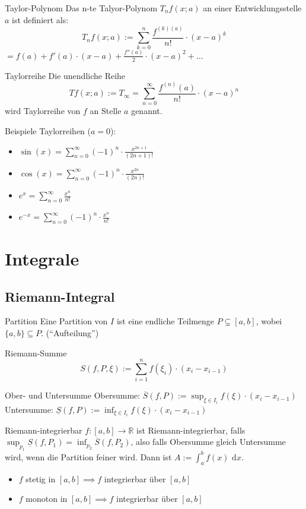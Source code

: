 \documentclass[a4paper,10pt]{article}
\def\sumn{\sum\limits_{n=0}^{\infty}}
\def\R{\mathbb{R}}
\def\dx{\text{ d}x}
\begin{document}
\begin{subbox}{Taylor-Polynom}
 Das n-te Talyor-Polynom $T_n f(x; a)$ an einer Entwicklungsstelle $a$ ist definiert als:
 $$T_n f(x; a) := \sum_{k=0}^{n} \frac{f^{(k) (a)}}{n!} \cdot (x - a)^k$$ 
 $ = f(a) + f'(a) \cdot (x-a) + \frac{f''(a)}{2} \cdot (x - a)^2 + \ldots$
\end{subbox}

\begin{mainbox}{Taylorreihe}
 Die unendliche Reihe
 $$Tf(x;a) := T_\infty = \sumn \frac{f^{(n)}(a)}{n!} \cdot (x-a)^n$$
 wird Taylorreihe von $f$ an Stelle $a$ genannt.
\end{mainbox}
Beispiele Taylorreihen ($a = 0$):
\begin{itemize}
 \item $\sin(x) = \sumn (-1)^n \cdot \frac{x^{2n+1}}{(2n+1)!}$
 \item $\cos(x) = \sumn (-1)^n \cdot \frac{x^{2n}}{(2n)!}$
 \item $e^x = \sumn \frac{x^n}{n!}$
 \item $e^{-x} = \sumn (-1)^n \cdot \frac{x^n}{n!}$
\end{itemize}

\section{Integrale}
\subsection{Riemann-Integral}
\begin{subbox}{Partition}
 Eine Partition von $I$ ist eine endliche Teilmenge $P \subsetneq [a,b]$, wobei $\{a,b\} \subseteq P$. (``Aufteilung'')
\end{subbox}
\begin{mainbox}{Riemann-Summe}
 $$S(f, P, \xi) := \sum_{i=1}^n f(\xi_i) \cdot (x_i - x_{i-1})$$
\end{mainbox}
\begin{subbox}{Ober- und Untersumme}
 Obersumme: $\overline{S}(f,P) := \sup_{\xi \in I_i} f(\xi) \cdot (x_i - x_{i-1})$ \\
 Untersumme: $\underline{S}(f,P) := \inf_{\xi \in I_i} f(\xi) \cdot (x_i - x_{i-1})$
\end{subbox}
\begin{mainbox}{Riemann-integrierbar}
 $f:[a,b] \to \R$ ist Riemann-integrierbar, falls $\sup_{p_1} \underline{S}(f,P_1) = \inf_{p_2}\overline{S}(f, P_2)$, also falls Obersumme gleich Untersumme wird, wenn die Partition feiner wird. Dann ist $A := \int_a^b f(x)\dx$.
\end{mainbox}
\begin{itemize}
 \item $f$ stetig in $[a,b] \implies f$ integrierbar über $[a,b]$
 \item $f$ monoton in $[a,b] \implies f$ integrierbar über $[a,b]$
\end{itemize}
\end{document}
